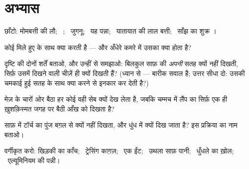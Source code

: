 \section{अभ्यास}

\begin{exercise}[$\star$]\label{exo:g7:light-sources-propagation:1}
छाँटो: मोमबत्ती की लौ; \ ; \ जुगनू; \ यह पन्ना; \ यातायात की
लाल बत्ती; \ साँझ का शुक्र ।
\end{exercise}

\begin{exercise}[$\star$]\label{exo:g7:light-sources-propagation:2}
कोई  मिले हुए  के साथ क्या करती है --- और अँधेरे कमरे
में उसका क्या होता है?
\end{exercise}

\begin{exercise}[$\star$]\label{exo:g7:light-sources-propagation:3}
दृष्टि की दोनों शर्तें बताओ, और उन्हीं से समझाओ: बिलकुल साफ़  की
\emph{अपनी} सतह क्यों नहीं दिखती, सिर्फ़ उसमें दिखने वाली चीज़ें ही
क्यों दिखती हैं? (ध्यान से --- बारीक सवाल है; उत्तर सीधा दो: उसकी
चमकाई हुई सतह  के साथ क्या करने से इनकार कर देती है?)
\end{exercise}

\begin{exercise}[$\star$]\label{exo:g7:light-sources-propagation:4}
मेज़ के चारों ओर बैठा हर कोई वही सेब क्यों देख लेता है, जबकि चम्मच में
लैंप का  सिर्फ़ एक ही ख़ुशक़िस्मत जगह पर बैठी आँख को दिखता है?
\end{exercise}

\begin{exercise}[$\star$]\label{exo:g7:light-sources-propagation:5}
साफ़  में टॉर्च का पुंज बग़ल से क्यों नहीं दिखता, और धुंध में क्यों
दिख जाता है? इस प्रक्रिया का नाम बताओ।
\end{exercise}

\begin{exercise}[$\star$]\label{exo:g7:light-sources-propagation:6}
वर्गीकृत करो: खिड़की का काँच; \ ट्रेसिंग काग़ज़; \ एक ईंट; \ उथला
साफ़ पानी; \ धुँधले  का ख़ोल; \ एल्यूमिनियम की पन्नी।
\end{exercise}

